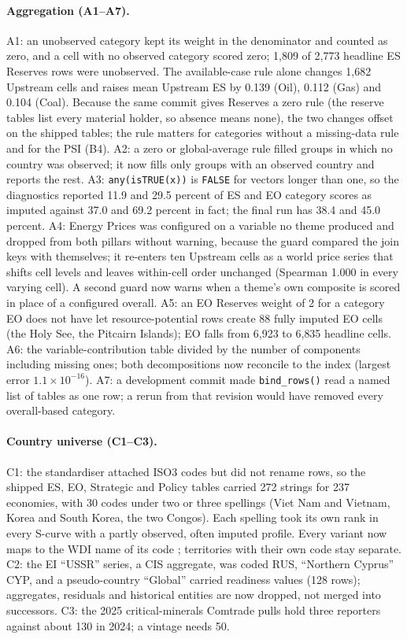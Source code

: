 \paragraph{Aggregation (A1--A7).} A1: an unobserved category kept its weight in the denominator and
counted as zero, and a cell with no observed category scored zero; 1{,}809 of 2{,}773 headline ES
Reserves rows were unobserved. The available-case rule alone changes 1{,}682 Upstream cells and
raises mean Upstream ES by 0.139 (Oil), 0.112 (Gas) and 0.104 (Coal). Because the same commit gives
Reserves a zero rule (the reserve tables list every material holder, so absence means none), the two
changes offset on the shipped tables; the rule matters for categories without a missing-data rule
and for the PSI (B4). A2: a zero or global-average rule filled groups in which no country was
observed; it now fills only groups with an observed country and reports the rest. A3:
\texttt{any(isTRUE(x))} is \texttt{FALSE} for vectors longer than one, so the diagnostics reported
11.9 and 29.5 percent of ES and EO category scores as imputed against 37.0 and 69.2 percent in fact;
the final run has 38.4 and 45.0 percent. A4: Energy Prices was configured on a variable no theme
produced and dropped from both pillars without warning, because the guard compared the join keys with
themselves; it re-enters ten Upstream cells as a world price series that shifts cell levels and
leaves within-cell order unchanged (Spearman 1.000 in every varying cell). A second guard now warns
when a theme's own composite is scored in place of a configured overall. A5: an EO Reserves weight
of 2 for a category EO does not have let resource-potential rows create 88 fully imputed EO cells
(the Holy See, the Pitcairn Islands); EO falls from 6{,}923 to 6{,}835 headline cells. A6: the
variable-contribution table divided by the number of components including missing ones; both
decompositions now reconcile to the index (largest error $1.1\times10^{-16}$). A7: a development
commit made \texttt{bind\_rows()} read a named list of tables as one row; a rerun from that revision
would have removed every overall-based category.

\paragraph{Country universe (C1--C3).} C1: the standardiser attached ISO3 codes but did not rename
rows, so the shipped ES, EO, Strategic and Policy tables carried 272 strings for 237 economies, with
30 codes under two or three spellings (Viet Nam and Vietnam, Korea and South Korea, the two Congos).
Each spelling took its own rank in every S-curve with a partly observed, often imputed profile.
Every variant now maps to the WDI name of its code \citep{worldbank2026wdi}; territories with their
own code stay separate. C2: the EI ``USSR'' series, a CIS aggregate, was coded RUS, ``Northern
Cyprus'' CYP, and a pseudo-country ``Global'' carried readiness values (128 rows); aggregates,
residuals and historical entities are now dropped, not merged into successors. C3: the 2025
critical-minerals Comtrade pulls hold three reporters against about 130 in 2024; a vintage needs 50.

